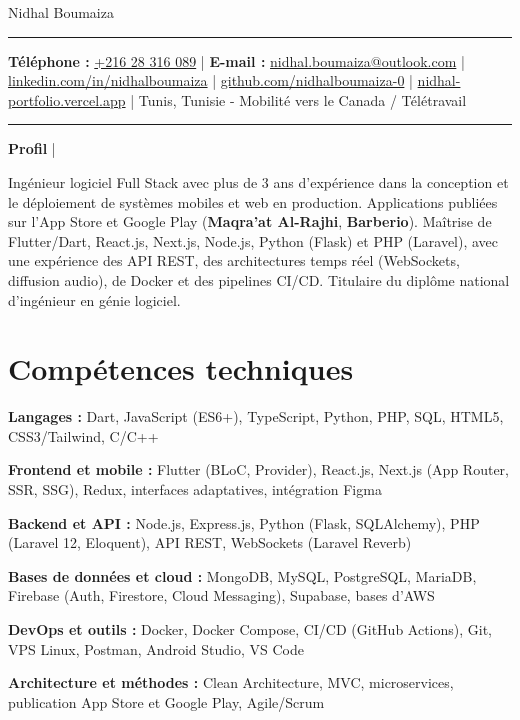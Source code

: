 \documentclass[letterpaper,10pt]{article}
\newcommand{\documentTitle}[2]{
  \begin{center}
    {\Huge\color{accentTitle} #1}
    \vspace{8pt}
    
    {\color{accentLine} \hrule}
    \vspace{3pt}
    \footnotesize{#2}
    \vspace{3pt}
    {\color{accentLine} \hrule}
  \end{center}
}
\newcommand{\tinysection}[1]{
  \phantomsection
  \addcontentsline{toc}{section}{#1}
  {\large{\bfseries\color{accentText}#1} {\color{accentLine} |}}
}
\newenvironment{resume_list}{
  \vspace{-7pt}
  \begin{itemize}[itemsep=-2pt, parsep=1pt, leftmargin=30pt]
}{
  \end{itemize}
}
\begin{document}
\documentTitle{Nidhal Boumaiza}{\textbf{Téléphone :} \href{tel:+21628316089}{+216 28 316 089} | \textbf{E-mail :} \href{mailto:nidhal.boumaiza@outlook.com}{nidhal.boumaiza@outlook.com} | \href{https://linkedin.com/in/nidhalboumaiza}{linkedin.com/in/nidhalboumaiza} | \href{https://github.com/nidhalboumaiza-0}{github.com/nidhalboumaiza-0} | \href{https://nidhal-portfolio.vercel.app/}{nidhal-portfolio.vercel.app} | Tunis, Tunisie - Mobilité vers le Canada / Télétravail}

\tinysection{Profil}
Ingénieur logiciel Full Stack avec plus de 3 ans d'expérience dans la conception et le déploiement de systèmes mobiles et web en production. Applications publiées sur l'App Store et Google Play (\textbf{Maqra'at Al-Rajhi}, \textbf{Barberio}). Maîtrise de Flutter/Dart, React.js, Next.js, Node.js, Python (Flask) et PHP (Laravel), avec une expérience des API REST, des architectures temps réel (WebSockets, diffusion audio), de Docker et des pipelines CI/CD. Titulaire du diplôme national d'ingénieur en génie logiciel.

\section{Compétences techniques}

\begin{resume_list}

  \item \textbf{Langages :} Dart, JavaScript (ES6+), TypeScript, Python, PHP, SQL, HTML5, CSS3/Tailwind, C/C++

  \item \textbf{Frontend et mobile :} Flutter (BLoC, Provider), React.js, Next.js (App Router, SSR, SSG), Redux, interfaces adaptatives, intégration Figma

  \item \textbf{Backend et API :} Node.js, Express.js, Python (Flask, SQLAlchemy), PHP (Laravel 12, Eloquent), API REST, WebSockets (Laravel Reverb)

  \item \textbf{Bases de données et cloud :} MongoDB, MySQL, PostgreSQL, MariaDB, Firebase (Auth, Firestore, Cloud Messaging), Supabase, bases d'AWS

  \item \textbf{DevOps et outils :} Docker, Docker Compose, CI/CD (GitHub Actions), Git, VPS Linux, Postman, Android Studio, VS Code

  \item \textbf{Architecture et méthodes :} Clean Architecture, MVC, microservices, publication App Store et Google Play, Agile/Scrum

\end{resume_list}
\end{document}

